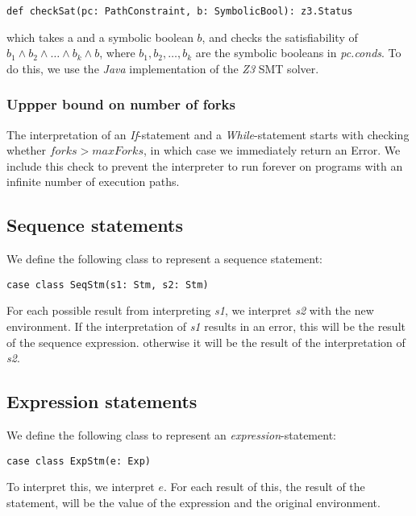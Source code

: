 \begin{lstlisting}[style=simple]
def checkSat(pc: PathConstraint, b: SymbolicBool): z3.Status
\end{lstlisting}
which takes a \pc  and a symbolic boolean $b$, and checks the satisfiability of $b_1 \land b_2 \land \ldots \land b_k \land b$, where $b_1, b_2, \ldots, b_k$ are the symbolic booleans in \textsl{pc.conds}. To do this, we use the \textsl{Java} implementation of the \textsl{Z3} SMT solver. 
 
\subsubsection{Uppper bound on number of forks}

The interpretation of an \textsl{If}-statement and a \textsl{While}-statement starts with checking whether $forks > maxForks$, in which case we immediately return an Error. We include this check to prevent the interpreter to run forever on programs with an infinite number of execution paths. 

\subsection{Sequence statements}

We define the following class to represent a sequence statement:
\begin{lstlisting}[style=simple]
	case class SeqStm(s1: Stm, s2: Stm)
\end{lstlisting}
For each possible result from interpreting \textsl{s1}, we interpret \textsl{s2} with the new environment. If the interpretation of \textsl{s1} results in an error, this will be the result of the sequence expression. otherwise it will be the result of the interpretation of \textsl{s2}. 	

\subsection{Expression statements}
We define the following class to represent an \textsl{expression}-statement:
\begin{lstlisting}[style=simple]
case class ExpStm(e: Exp)
\end{lstlisting}
To interpret this, we interpret $e$. For each result of this, the result of the statement, will be the value of the expression and the original environment. 
